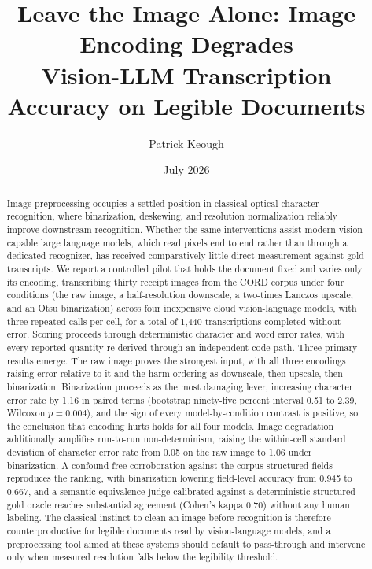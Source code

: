 \documentclass[11pt]{article}
\title{\textbf{Leave the Image Alone: Image Encoding Degrades\\
Vision-LLM Transcription Accuracy on Legible Documents}}
\author[1]{Patrick Keough}
\affil[1]{Independent Researcher, \texttt{pskeough@gmail.com}}
\date{July 2026}
\begin{document}
\maketitle

\begin{abstract}
Image preprocessing occupies a settled position in classical optical character recognition, where
binarization, deskewing, and resolution normalization reliably improve downstream recognition.
Whether the same interventions assist modern vision-capable large language models, which read
pixels end to end rather than through a dedicated recognizer, has received comparatively little
direct measurement against gold transcripts. We report a controlled pilot that holds the document
fixed and varies only its encoding, transcribing thirty receipt images from the CORD corpus under
four conditions (the raw image, a half-resolution downscale, a two-times Lanczos upscale, and an
Otsu binarization) across four inexpensive cloud vision-language models, with three repeated calls
per cell, for a total of 1{,}440 transcriptions completed without error. Scoring proceeds through
deterministic character and word error rates, with every reported quantity re-derived through an
independent code path. Three primary results emerge. The raw image proves the strongest input,
with all three encodings raising error relative to it and the harm ordering as downscale, then
upscale, then binarization. Binarization proceeds as the most damaging lever, increasing character
error rate by 1.16 in paired terms (bootstrap ninety-five percent interval 0.51 to 2.39, Wilcoxon
$p = 0.004$), and the sign of every model-by-condition contrast is positive, so the conclusion that
encoding hurts holds for all four models. Image degradation additionally amplifies run-to-run
non-determinism, raising the within-cell standard deviation of character error rate from 0.05 on
the raw image to 1.06 under binarization. A confound-free corroboration against the corpus structured
fields reproduces the ranking, with binarization lowering field-level accuracy from 0.945 to 0.667,
and a semantic-equivalence judge calibrated against a deterministic structured-gold oracle reaches
substantial agreement (Cohen's kappa 0.70) without any human labeling. The classical instinct to
clean an image before
recognition is therefore counterproductive for legible documents read by vision-language models,
and a preprocessing tool aimed at these systems should default to pass-through and intervene only
when measured resolution falls below the legibility threshold.
\end{abstract}
\end{document}
